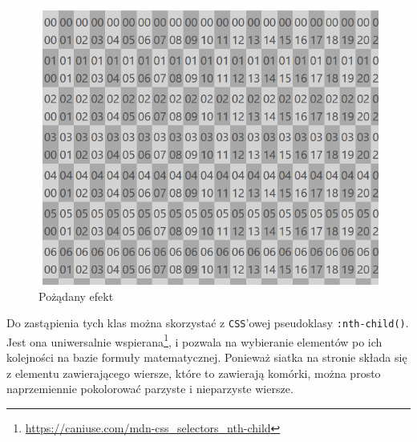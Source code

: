 \documentclass[licencjacka]{pracadypl}
\begin{document}
\begin{figure}[H]
  \centering
  \includegraphics[width=\linewidth/\real{2.5}]{images/ui-grid-darken.png}
  \caption{Pożądany efekt}
  \label{fig:ui-grid-darken}
\end{figure}

Do zastąpienia tych klas można skorzystać z \texttt{CSS}'owej pseudoklasy \texttt{:nth-child()}. Jest ona uniwersalnie wspierana\footnote{\url{https://caniuse.com/mdn-css_selectors_nth-child}}, i pozwala na wybieranie elementów po ich kolejności na bazie formuły matematycznej. Ponieważ siatka na stronie składa się z elementu zawierającego wiersze, które to zawierają komórki, można prosto naprzemiennie pokolorować parzyste \linebreak i nieparzyste wiersze.
\end{document}
